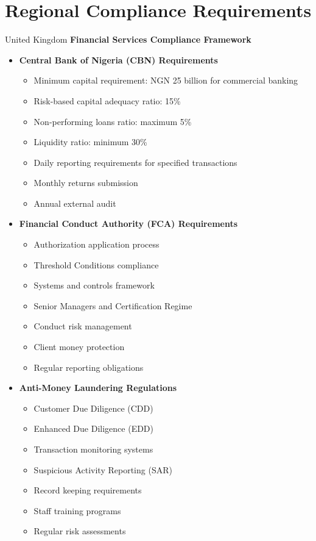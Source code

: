 \FloatBarrier
\section{Regional Compliance Requirements}\label{sec:regional-compliance-requirements}

\begin{regionalbox}{United Kingdom}
\textbf{Financial Services Compliance Framework}
\begin{itemize}
    \item \textbf{Central Bank of Nigeria (CBN) Requirements}
    \begin{itemize}
        \item Minimum capital requirement: NGN 25 billion for commercial banking
        \item Risk-based capital adequacy ratio: 15\%
        \item Non-performing loans ratio: maximum 5\%
        \item Liquidity ratio: minimum 30\%
        \item Daily reporting requirements for specified transactions
        \item Monthly returns submission
        \item Annual external audit
    \end{itemize}

    \item \textbf{Financial Conduct Authority (FCA) Requirements}
    \begin{itemize}
        \item Authorization application process
        \item Threshold Conditions compliance
        \item Systems and controls framework
        \item Senior Managers and Certification Regime
        \item Conduct risk management
        \item Client money protection
        \item Regular reporting obligations
    \end{itemize}

    \item \textbf{Anti-Money Laundering Regulations}
    \begin{itemize}
        \item Customer Due Diligence (CDD)
        \item Enhanced Due Diligence (EDD)
        \item Transaction monitoring systems
        \item Suspicious Activity Reporting (SAR)
        \item Record keeping requirements
        \item Staff training programs
        \item Regular risk assessments
    \end{itemize}


\end{itemize}
\end{regionalbox}
